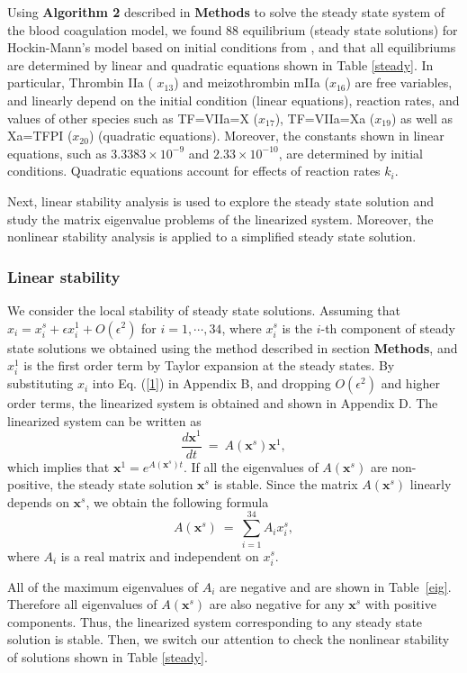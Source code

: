 Using \textbf{Algorithm 2} described in \textbf{Methods} to solve the steady state system of the
blood coagulation model, we found $88$ equilibrium (steady state
solutions) for Hockin-Mann's model based on initial conditions from
\cite{HocJon02}, and that all equilibriums are determined by linear
and quadratic equations shown in Table \ref{steady}. In particular,
Thrombin IIa ( $x_{13}$) and meizothrombin mIIa ($x_{16}$) are free
variables, and linearly depend on the initial condition (linear
equations), reaction rates, and values of other species such as
TF=VIIa=X ($x_{17}$), TF=VIIa=Xa ($x_{19}$) as well as Xa=TFPI
($x_{20}$) (quadratic equations). Moreover, the constants shown in
linear equations, such as $3.3383\times10^{-9}$ and
$2.33\times10^{-10}$, are determined by initial conditions.
Quadratic equations account for effects of reaction rates $k_i$.

Next, linear stability analysis is used to explore the steady state
solution and study the matrix eigenvalue problems of the linearized
system. Moreover, the nonlinear stability analysis is applied to a
simplified steady state solution.

\subsubsection*{Linear stability}
We consider the local stability of steady state solutions. Assuming
that $x_i=x_i^s+\epsilon x_i^1+O(\epsilon^2)$ for $ i =
1,\cdots,34$, where $x_i^s$ is the $i$-th component of steady state
solutions we obtained using the method described in section {\bf
Methods}, and $x_i^1$ is the first order term by Taylor expansion at
the steady states. By substituting $x_i$ into Eq. (\ref{1}) in
Appendix B, and dropping $O(\epsilon^2)$ and higher order terms, the
linearized system is obtained and shown in Appendix D. The
linearized system can be written as
\[\frac{d\mathbf{x}^1}{dt}~=~A(\mathbf{x}^s)\mathbf{x}^1,\]
which implies that $\mathbf{x}^1=e^{A(\mathbf{x}^s)t}$. If all the
eigenvalues of $A(\mathbf{x}^s)$ are non-positive, the steady state
solution $\mathbf{x}^s$ is stable. Since the matrix
$A(\mathbf{x}^s)$ linearly depends on $\mathbf{x}^s$, we obtain the
following formula
\[A(\mathbf{x}^s)~=~\sum_{i=1}^{34} A_i x^s_i,\]
where $A_i$ is a real matrix and independent on $x^s_i$.

All of the maximum eigenvalues of $A_i$ are negative and are shown in
Table~\ref{eig}. Therefore all eigenvalues of $A(\mathbf{x}^s)$ are
also negative for any $\mathbf{x}^s$ with positive components. Thus,
 the linearized system corresponding to any steady state solution is
stable. Then, we switch our attention to check the nonlinear
stability of solutions shown in Table \ref{steady}.

